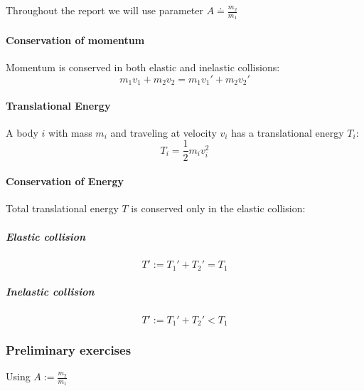\documentclass{scrreprt}
\begin{document}
Throughout the report we will use parameter $\displaystyle A\doteq \frac{m_2}{m_1}$

\paragraph*{Conservation of momentum}
Momentum is conserved in both elastic and inelastic collisions:
\begin{equation}
m_1 v_1 + m_2 v_2 = m_1 v_1' + m_2 v_2'
\end{equation}

\paragraph*{Translational Energy}
A body $i$ with mass $m_i$ and traveling at velocity $v_i$ has a translational energy $T_i$:
\begin{equation}
T_i = \frac{1}{2} m_i v_i^2
\end{equation}

\paragraph*{Conservation of Energy}
Total translational energy $T$ is conserved only in the elastic collision:
\subparagraph*{Elastic collision}
\begin{equation}
T':=T_1'+T_2'=T_1
\end{equation}
\subparagraph*{Inelastic collision}
\begin{equation}
T':=T_1'+T_2'<T_1
\end{equation}

\subsubsection{Preliminary exercises}
Using $A:=\frac{m_2}{m_1}$
\end{document}
